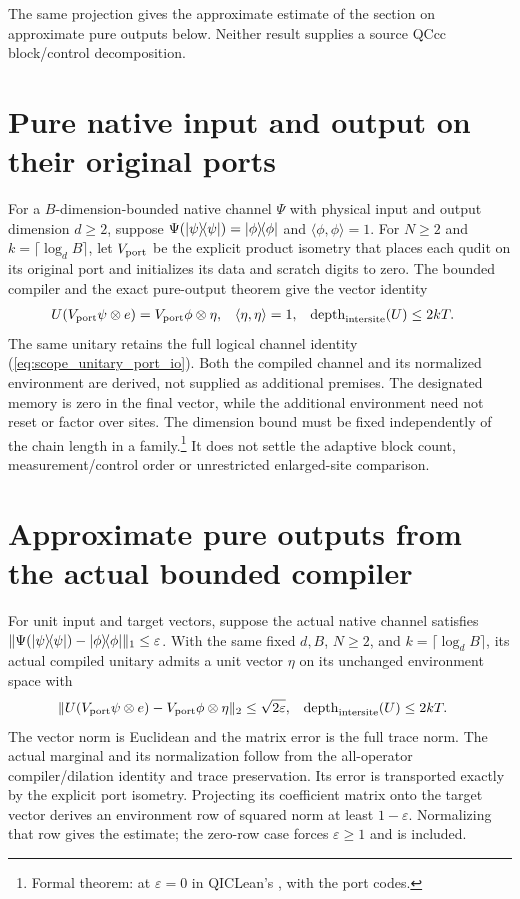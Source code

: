 \documentclass{article}
\begin{document}
The same projection gives the approximate estimate of the section on
approximate pure outputs below. Neither result supplies a source QCcc
block/control decomposition.


\section{Pure native input and output on their original ports}
For a $B$-dimension-bounded native channel $\Psi$ with physical input and
output dimension $d\ge2$, suppose
$\Psi(|\psi\rangle\!\langle \psi|)=|\phi\rangle\!\langle \phi|$ and
$\langle\phi,\phi\rangle=1$. For $N\ge2$ and
$k=\lceil\log_d B\rceil$, let $V_{\rm port}$ be the explicit product
isometry that places each qudit on its original port and initializes its
data and scratch digits to zero. The bounded compiler and the exact
pure-output theorem give the vector identity
\begin{align}
    U(V_{\rm port}\psi\otimes e)
     & =V_{\rm port}\phi\otimes\eta,
     & \langle\eta,\eta\rangle                 & =1,
     & \operatorname{depth}_{\rm intersite}(U) & \le2kT.
    \label{eq:scope_bounded_port_pure_vector}
\end{align}
The same unitary retains the full logical channel identity
(\ref{eq:scope_unitary_port_io}). Both the compiled channel and its
normalized environment are derived, not supplied as additional premises.
The designated memory is zero in the final vector, while the
additional environment need not reset or factor over sites. The dimension
bound must be fixed independently of the chain length in a
family.\footnote{Formal theorem:
    at $\varepsilon=0$ in QICLean's ,
    with the port codes.}
It does not settle the adaptive block count, measurement/control order
or unrestricted enlarged-site comparison.

\section{Approximate pure outputs from the actual bounded compiler}
For unit input and target vectors, suppose the actual native channel
satisfies
$\|\Psi(|\psi\rangle\!\langle \psi|)-|\phi\rangle\!\langle \phi|\|_1\le\varepsilon$.
With the same fixed $d,B$, $N\ge2$, and $k=\lceil\log_d B\rceil$, its
actual compiled unitary admits a unit vector $\eta$ on its unchanged
environment space with
\begin{align}
    \|U(V_{\rm port}\psi\otimes e)
    -V_{\rm port}\phi\otimes\eta\|_2 & \le\sqrt{2\varepsilon},
                                     & \operatorname{depth}_{\rm intersite}(U) & \le2kT.
\end{align}
The vector norm is Euclidean and the matrix error is the full trace norm.
The actual marginal and its normalization follow from the all-operator
compiler/dilation identity and trace preservation. Its error is transported
exactly by the explicit port isometry. Projecting its coefficient matrix
onto the target vector derives an environment row of squared norm at least
$1-\varepsilon$. Normalizing that row gives the estimate; the zero-row case
forces $\varepsilon\ge1$ and is included.
\end{document}
